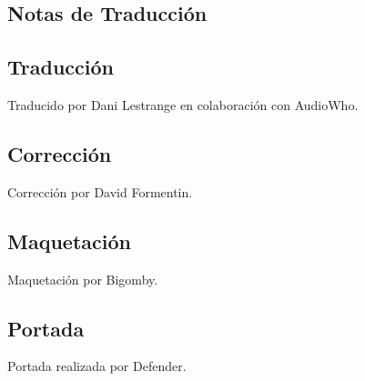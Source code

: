 \begin{center}
\section*{Notas de Traducción}
\end{center}

\subsection*{Traducción}\label{traducciuxf3n}
Traducido por Dani Lestrange en colaboración con AudioWho.

\subsection*{Corrección}\label{correcciuxf3n}
Corrección por David Formentin.

\subsection*{Maquetación}\label{maquetaciuxf3n}
Maquetación por Bigomby.

\subsection*{Portada}\label{portada}
Portada realizada por Defender.
